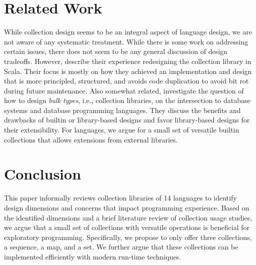 \documentclass[sigconf, authorversion]{acmart}
\def\LangCnt{14\xspace}
\begin{document}
% 


\section{Related Work}

While collection design seems to be an integral aspect of language design,
we are not aware of any systematic treatment.
While there is some work on addressing certain 
issues\citep{Cook:1992:ISS,Black:2003:ATS,Chakravarty:2005:ATC,Garcia:2007},
there does not seem to be any general discussion of design tradeoffs.
However, \citet{Odersky:2009} describe their experience
redesigning the collection library in Scala.
Their focus is mostly on how they achieved an implementation and design
that is more principled, structured, and avoids code duplication
to avoid bit rot during future maintenance.
Also somewhat related, \citet{Matthes:2000:BT} investigate the question of how to design \emph{bulk types}, i.e., collection libraries, on the intersection to database systems and database programming languages.
They discuss the benefits and drawbacks of builtin or library-based designs and favor library-based designs for their extensibility.
For languages, we argue for a small set of versatile builtin collections
that allows extensions from external libraries.

\section{Conclusion}

This paper informally reviews collection libraries of \LangCnt languages to identify
design dimensions and concerns that impact programming experience.
Based on the identified dimensions
and a brief literature review of collection usage studies,
we argue that a small set of collections with versatile operations
is beneficial for exploratory programming.
Specifically, we propose to only offer three collections, a sequence, a map, and a set.
We further argue that these collections can be implemented efficiently
with modern run-time techniques.
\end{document}
